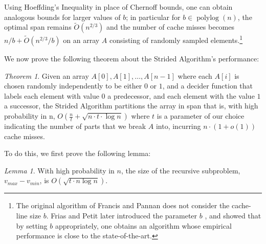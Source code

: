 \documentclass[11pt]{article}
\renewcommand{\paragraph}[1]{\vspace{0.09in}\noindent{\bf \boldmath #1.}}
\theoremstyle{remark}
\newtheorem{theorem}{Theorem}[section]
\newtheorem{lemma}[thm]{Lemma}
\theoremstyle{remark}
\begin{document}
Using Hoeffding's Inequality in place of Chernoff bounds, one can
obtain analogous bounds for larger values of $b$; in particular for $b
\in \operatorname{polylog}(n)$, the optimal span remains
$\tilde{O}(n^{2/3})$ and the number of cache misses becomes $n / b +
\tilde{O}(n^{2/3} / b)$ on an array $A$ consisting of randomly sampled
elements.\footnote{The original algorithm of Francis and Pannan
  \cite{FrancisPa92} does not consider the cache-line size $b$. Frias
  and Petit later introduced the parameter $b$ \cite{Frias08}, and
  showed that by setting $b$ appropriately, one obtains an algorithm
  whose empirical performance is close to the state-of-the-art.}

\paragraph{Strided Algorithm Analysis}
We now prove the following theorem about the Strided Algorithm's performance:
\begin{theorem}
Given an array $A[0], A[1], \ldots, A[n-1]$ where each $A[i]$ is chosen randomly independently to be either $0$ or $1$, and a decider function that labels each element with value $0$ a predecessor, and each element with the value $1$ a successor, the Strided Algorithm partitions the array in span that is, with high probability in n, $O(\frac{n}{t}+\sqrt{n\cdot t\cdot\log n})$ where $t$ is a parameter of our choice indicating the number of parts that we break $A$ into, incurring $n\cdot(1+o(1))$ cache misses.
\label{thm:stridedAlg}
\end{theorem}

To do this, we first prove the following lemma:
\begin{lemma}
With high probability in $n$, the size of the recursive subproblem, $v_{max} - v_{min}$, is $O(\sqrt{t\cdot n\log n}).$
\label{lem:epsSmallFP}
\end{lemma}
\end{document}
